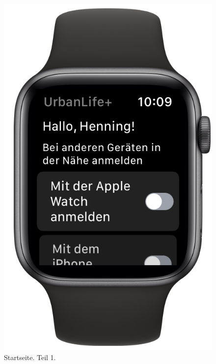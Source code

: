 \begin{minipage}{.45\textwidth}
	\begin{figure}[H]
		\centering
		\includegraphics[width=.68\textwidth]{./images/prototype/watchos/home1.png}
		\caption{\label{fig:app:watchos:home1}Startseite. Teil 1.}
	\end{figure}
\end{minipage}\hfill
